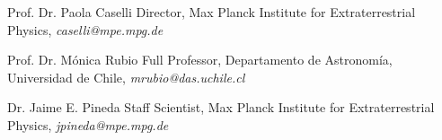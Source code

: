 

\begin{cvhonors}
	\cvhonor
	{Prof. Dr. Paola Caselli} %
	{Director, Max Planck Institute for Extraterrestrial Physics, \textit{caselli@mpe.mpg.de}} %
	{} %
	{} %
	
	\cvhonor
	{Prof. Dr. M\'onica Rubio} %
	{Full Professor, Departamento de Astronom\'ia, Universidad de Chile, \textit{mrubio@das.uchile.cl}} %
	{} %
	{} %
	
	\cvhonor
	{Dr. Jaime E. Pineda} %
	{Staff Scientist, Max Planck Institute for Extraterrestrial Physics, \textit{jpineda@mpe.mpg.de}} %
	{} %
	{} %
\end{cvhonors}